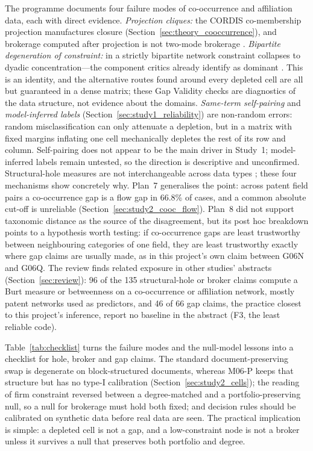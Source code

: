 The programme documents four failure modes of co-occurrence and affiliation data, each with direct evidence. \emph{Projection cliques:} the CORDIS co-membership projection manufactures closure (Section~\ref{sec:theory_cooccurrence}), and brokerage computed after projection is not two-mode brokerage \citep{jasny2015two}. \emph{Bipartite degeneration of constraint:} in a strictly bipartite network constraint collapses to dyadic concentration---the component critics already identify as dominant \citep{everett2020unpacking,johnson2026reassessing}. This is an identity, and the alternative routes found around every depleted cell are all but guaranteed in a dense matrix; these Gap Validity checks are diagnostics of the data structure, not evidence about the domains. \emph{Same-term self-pairing} and \emph{model-inferred labels} (Section~\ref{sec:study1_reliability}) are non-random errors: random misclassification can only attenuate a depletion, but in a matrix with fixed margins inflating one cell mechanically depletes the rest of its row and column. Self-pairing does not appear to be the main driver in Study~1; model-inferred labels remain untested, so the direction is descriptive and unconfirmed. Structural-hole measures are not interchangeable across data types \citep{saglietto2020research}; these four mechanisms show concretely why. Plan~7 generalises the point: across patent field pairs a co-occurrence gap is a flow gap in 66.8\% of cases, and a common absolute cut-off is unreliable (Section~\ref{sec:study2_cooc_flow}). Plan~8 did not support taxonomic distance as the source of the disagreement, but its post hoc breakdown points to a hypothesis worth testing: if co-occurrence gaps are least trustworthy between neighbouring categories of one field, they are least trustworthy exactly where gap claims are usually made, as in this project's own claim between G06N and G06Q. The review finds related exposure in other studies' abstracts (Section~\ref{sec:review}): 96 of the 135 structural-hole or broker claims compute a Burt measure or betweenness on a co-occurrence or affiliation network, mostly patent networks used as predictors, and 46 of 66 gap claims, the practice closest to this project's inference, report no baseline in the abstract (F3, the least reliable code).

Table~\ref{tab:checklist} turns the failure modes and the null-model lessons into a checklist for hole, broker and gap claims. The standard document-preserving swap is degenerate on block-structured documents, whereas M06-P keeps that structure but has no type-I calibration (Section~\ref{sec:study2_cells}); the reading of firm constraint reversed between a degree-matched and a portfolio-preserving null, so a null for brokerage must hold both fixed; and decision rules should be calibrated on synthetic data before real data are seen. The practical implication is simple: a depleted cell is not a gap, and a low-constraint node is not a broker unless it survives a null that preserves both portfolio and degree.

